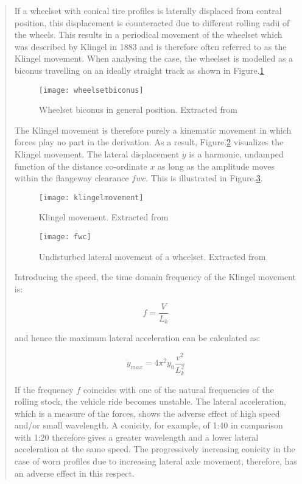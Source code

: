 \begin{appendices}
\begin{quote}
If a wheelset with conical tire profiles is laterally displaced from central position, this displacement is counteracted due to different rolling radii of the wheels. This results in a periodical movement of the wheelset which was described by Klingel in 1883 and is therefore often referred to as the Klingel movement. When analysing the case, the wheelset is modelled as a biconus travelling on an ideally straight track as shown in Figure.\ref{fig:wheelsetbiconus}

\begin{figure}[h]
    \centering
    \texttt{[image: wheelsetbiconus]}
    \caption{Wheelset biconus in general position. Extracted from \citet[Figure 2.2]{esveld2001modern}}
    \label{fig:wheelsetbiconus}
\end{figure}


The Klingel movement is therefore purely a kinematic movement in which forces play no part in the derivation. As a result, Figure.\ref{fig:klingelmovement} visualizes the Klingel movement. The lateral displacement $y$ is a harmonic, undamped function of the distance co-ordinate $x$ as long as the amplitude moves within the flangeway clearance $fwc$. This is illustrated in Figure.\ref{fig:fwc}.

\begin{figure}[h]
    \centering
    \texttt{[image: klingelmovement]}
    \caption{Klingel movement. Extracted from \citet[Figure 2.3]{esveld2001modern}}
    \label{fig:klingelmovement}
\end{figure}

\begin{figure}[h]
    \centering
    \texttt{[image: fwc]}
    \caption{Undisturbed lateral movement of a wheelset. Extracted from \citet[Figure 2.4]{esveld2001modern}}
    \label{fig:fwc}
\end{figure}

Introducing the speed, the time domain frequency of the Klingel movement is:

$$ f = \frac{V}{L_k} $$

and hence the maximum lateral acceleration can be calculated as:

$$\ddot{y}_{max} = 4\pi^2y_0\frac{v^2}{L_k^2}$$

If the frequency $f$ coincides with one of the natural frequencies of the rolling stock, the vehicle ride becomes unstable. The lateral acceleration, which is a measure of the forces, shows the adverse effect of high speed and/or small wavelength. A conicity, for example, of 1:40 in comparison with 1:20 therefore gives a greater wavelength and a lower lateral acceleration at the same speed. The progressively increasing conicity in the case of worn profiles due to increasing lateral axle movement, therefore, has an adverse effect in this respect.
\end{quote}

\end{appendices}
